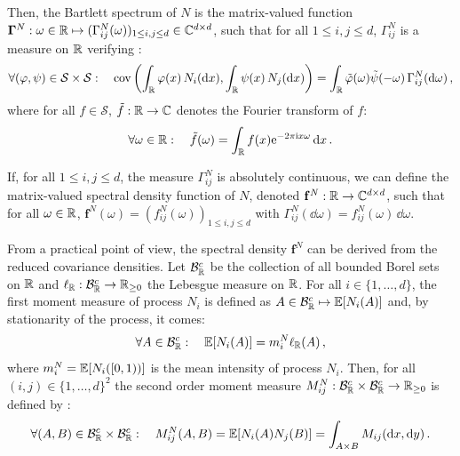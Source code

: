         Then, the Bartlett spectrum of $N$ is the
        matrix-valued function $\mathbf{\Gamma}^N : \omega \in {\mathbb R} \mapsto (\Gamma_{ij}^N(\omega))_{1 \le i, j \le d} \in \mathbb C^{d \times d}$, such that for all $1 \le i,j \le d$, $\Gamma_{ij}^N$ is a measure on ${\mathbb R}$ verifying \parencite[Equation 8.4.13]{DaleyV1}:
        \[
          \forall (\varphi, \psi) \in \mathcal S \times \mathcal S:
          \quad
          \operatorname{cov} \left(
            \int_{{\mathbb R}}{\varphi(x) \, N_i(\mathrm{d}x)} , \int_{{\mathbb R}}{\psi(x) \, N_j(\mathrm{d}x)}
          \right)
          = \int_{{\mathbb R}}{ \tilde{\varphi} (\omega) \tilde{\psi}(-\omega) \, \Gamma_{ij}^N (\mathrm{d}\omega)}\,,
        \]        
        where for all $f \in \mathcal S$, $\tilde f : {\mathbb R} \to \mathbb C$ denotes the Fourier transform of $f$:
        \[
          \forall \omega \in {\mathbb R}: \quad
          \tilde f(\omega) = \int_{{\mathbb R}}{ f(x) \mathrm{e}^{-2\pi \mathrm{i} x \omega} \, {\mathrm{d}} x} \,.
        \]
        
        If, for all $1 \le i, j \le d$, the measure $\Gamma_{ij}^N$ is absolutely continuous,
        we can define the matrix-valued spectral density function of $N$, denoted $\mathbf f^N : {\mathbb R} \to \mathbb C^{d \times d}$,
        such that for all $\omega \in {\mathbb R}$, $\mathbf f^N(\omega) = (f^N_{ij}(\omega))_{1 \le i, j \le d}$
        with \(\Gamma_{ij}^N(\dd \omega) = f_{ij}^N(\omega) \, \dd \omega\).
      	
      	From a practical point of view, the spectral density $\mathbf f^N$ can be derived from the reduced covariance densities. 
        Let $\mathcal{B}_{{\mathbb R}}^c$ be the collection of all bounded Borel sets on \({\mathbb R}\) and $\ell_{{\mathbb R}} : \mathcal B_{{\mathbb R}}^c \to {\mathbb R}_{\ge0}$ the Lebesgue measure on \({\mathbb R}\).
        For all $i \in \{1, \dots, d\}$, the first moment measure of process $N_i$ is defined as $A \in \mathcal B_{\mathbb R}^c \mapsto {\mathbb E}[N_i(A)]$ and, by stationarity of the process,
        it comes:
        \[\forall A\in\mathcal{B}_{{\mathbb R}}^c: \quad {\mathbb E}[N_i(A)] = m_i^N \ell_{{\mathbb R}}(A)\,,\]
        where $m_i^N = {\mathbb E}[N_i([0, 1))]$ is the mean intensity of process $N_i$.
        Then, for all \((i, j) \in \{1, \dots, d\}^2\) the second order moment measure $M_{ij}^N : \mathcal B_{\mathbb R}^c \times \mathcal B_{\mathbb R}^c \to {\mathbb R}_{\ge0}$ is defined by \parencite[Section~5.4]{DaleyV1}:
        \[
          \forall (A, B) \in \mathcal{B}_{{\mathbb R}}^c \times \mathcal{B}_{{\mathbb R}}^c: \quad
    	    M_{ij}^N(A, B) = {\mathbb E}[N_i(A)N_j(B)] = \int_{A\times B}{M_{ij}({\mathrm{d}} x, {\mathrm{d}} y)} \,. 
        \]
        
